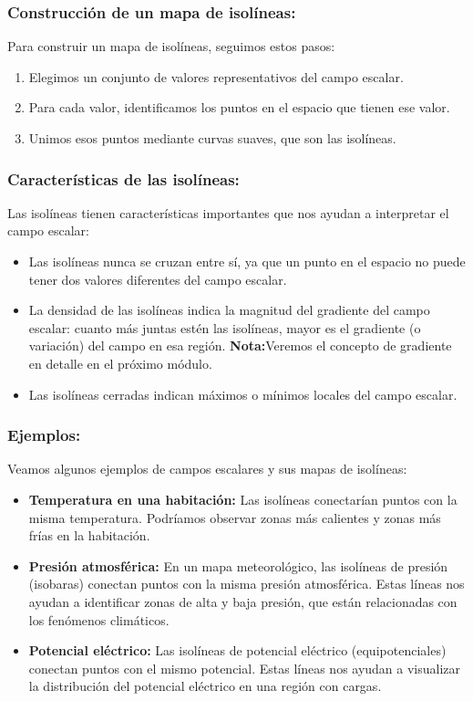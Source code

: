 \documentclass{book}
\begin{document}
  
\subsubsection{Construcción de un mapa de isolíneas:}


Para construir un mapa de isolíneas, seguimos estos pasos:

\begin{enumerate}
\item Elegimos un conjunto de valores representativos del campo escalar.
\item Para cada valor, identificamos los puntos en el espacio que tienen ese valor.
\item Unimos esos puntos mediante curvas suaves, que son las isolíneas.
\end{enumerate}

\subsubsection{Características de las isolíneas:}

Las isolíneas tienen características importantes que nos ayudan a interpretar el campo escalar:

\begin{itemize}
\item[\textbullet] Las isolíneas nunca se cruzan entre sí, ya que un punto en el espacio no puede tener dos valores diferentes del campo escalar.
\item[\textbullet] La densidad de las isolíneas indica la magnitud del gradiente del campo escalar: cuanto más juntas estén las isolíneas, mayor es el gradiente (o variación) del campo en esa región. \textbf{Nota:}Veremos el concepto de gradiente en detalle en el próximo módulo.
\item[\textbullet] Las isolíneas cerradas indican máximos o mínimos locales del campo escalar.
\end{itemize}

\subsubsection{Ejemplos:}

Veamos algunos ejemplos de campos escalares y sus mapas de isolíneas:

\begin{itemize}
\item[\textbullet] \textbf{Temperatura en una habitación:} Las isolíneas conectarían puntos con la misma temperatura. Podríamos observar zonas más calientes y zonas más frías en la habitación.
\item[\textbullet] \textbf{Presión atmosférica:} En un mapa meteorológico, las isolíneas de presión (isobaras) conectan puntos con la misma presión atmosférica. Estas líneas nos ayudan a identificar zonas de alta y baja presión, que están relacionadas con los fenómenos climáticos.
\item[\textbullet] \textbf{Potencial eléctrico:} Las isolíneas de potencial eléctrico (equipotenciales) conectan puntos con el mismo potencial. Estas líneas nos ayudan a visualizar la distribución del potencial eléctrico en una región con cargas.
\end{itemize}
\end{document}
